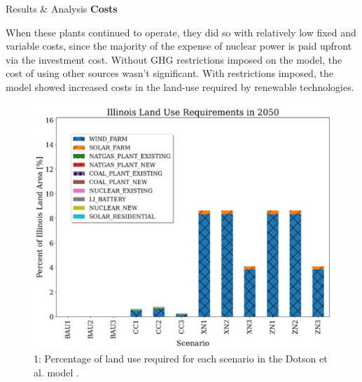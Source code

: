 \documentclass[final]{beamer}
\newlength{\onecolwid}
\newlength{\threecolwid}
\begin{document}
\begin{frame}[t]
\begin{columns}[t,totalwidth=\threecolwid]
\begin{column}{\onecolwid}
\begin{block}{Results \& Analysis}
\vspace{0.7em}
\textbf{Costs}
\vspace{0.7em}




When these plants continued to operate, they did so with relatively low fixed and variable costs, since the majority of the expense of nuclear power is paid upfront via the investment cost. Without GHG restrictions imposed on the model, the cost of using other sources wasn’t significant. With restrictions imposed, the model showed increased costs in the land-use required by renewable technologies.


\begin{figure}[ht] %
  \centering
  \includegraphics[scale=2.7]{land-use.png}
  \caption{1: Percentage of land use required for each scenario in the Dotson et al. model \cite{dotson}.}
  \label{fig:landuse}
\end{figure}


\end{block}
\end{column}
\end{columns}
\end{frame}
\end{document}
